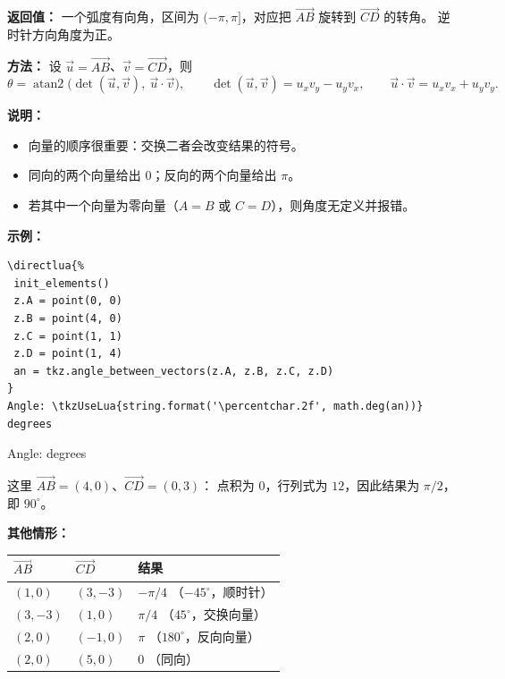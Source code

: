 \noindent\textbf{返回值：}
一个弧度有向角，区间为 $(-\pi,\pi]$，对应把 $\overrightarrow{AB}$ 旋转到 $\overrightarrow{CD}$ 的转角。
逆时针方向角度为正。

\medskip
\noindent\textbf{方法：}
设 $\vec u=\overrightarrow{AB}$、$\vec v=\overrightarrow{CD}$，则
\[
  \theta = \operatorname{atan2}\bigl(\det(\vec u,\vec v),\ \vec u\cdot\vec v\bigr),
  \qquad
  \det(\vec u,\vec v)=u_x v_y-u_y v_x,
  \qquad
  \vec u\cdot\vec v = u_x v_x+u_y v_y .
\]

\noindent\textbf{说明：}
\begin{itemize}
  \item 向量的顺序很重要：交换二者会改变结果的符号。
  \item 同向的两个向量给出 $0$；反向的两个向量给出 $\pi$。
  \item 若其中一个向量为零向量（$A=B$ 或 $C=D$），则角度无定义并报错。
\end{itemize}

\medskip
\noindent\textbf{示例：}
\begin{Verbatim}
\directlua{%
 init_elements()
 z.A = point(0, 0)
 z.B = point(4, 0)
 z.C = point(1, 1)
 z.D = point(1, 4)
 an = tkz.angle_between_vectors(z.A, z.B, z.C, z.D)
}
Angle: \tkzUseLua{string.format('\percentchar.2f', math.deg(an))} degrees
\end{Verbatim}
Angle:  degrees

这里 $\overrightarrow{AB}=(4,0)$、$\overrightarrow{CD}=(0,3)$：
点积为 $0$，行列式为 $12$，因此结果为
$\pi/2$，即 $90^\circ$。

\medskip
\noindent\textbf{其他情形：}

\begin{center}
\begin{tabular}{lll}
  \hline
  $\overrightarrow{AB}$ & $\overrightarrow{CD}$ & 结果 \\
  \hline
  $(1,0)$  & $(3,-3)$ & $-\pi/4$ \quad（$-45^\circ$，顺时针） \\
  $(3,-3)$ & $(1,0)$  & $\pi/4$ \quad（$45^\circ$，交换向量） \\
  $(2,0)$  & $(-1,0)$ & $\pi$ \quad（$180^\circ$，反向向量） \\
  $(2,0)$  & $(5,0)$  & $0$ \quad（同向） \\
  \hline
\end{tabular}
\end{center}

